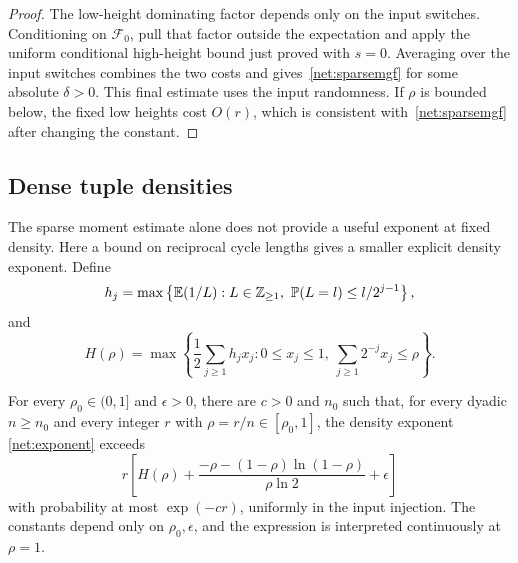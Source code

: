 \begin{proof}
The low-height dominating factor depends only on the input switches.
Conditioning on $\mathcal F_0$, pull that factor outside the
expectation and apply the uniform conditional high-height bound just
proved with $s=0$. Averaging over the input switches combines the
two costs and gives~\eqref{net:sparsemgf} for some absolute
$\delta>0$. This final estimate uses the input randomness.
If $\rho$ is bounded below, the fixed low heights cost $O(r)$,
which is consistent with~\eqref{net:sparsemgf} after changing the constant.
\end{proof}

\subsection{Dense tuple densities}\label{net:dense}
The sparse moment estimate alone does not provide a useful exponent at fixed density. Here a bound on reciprocal cycle lengths gives a smaller explicit density exponent. Define
\[
 h_j=\max\left\{\E(1/L):L\in\mathbb Z_{\ge1},\ \PP(L=l)\le l/2^{j-1}\right\},
\]
and
\[
 H(\rho)=\max\left\{\frac12\sum_{j\ge1}h_jx_j:
 0\le x_j\le1,\ \sum_{j\ge1}2^{-j}x_j\le\rho\right\}.
\]
\begin{proposition}\label{net:densetruncation}
For every $\rho_0\in(0,1]$ and $\epsilon>0$, there are
$c>0$ and $n_0$ such that, for every dyadic $n\ge n_0$ and
every integer $r$ with $\rho=r/n\in[\rho_0,1]$, the density
exponent \eqref{net:exponent} exceeds
\[
 r\left[H(\rho)+\frac{-\rho-(1-\rho)\ln(1-\rho)}{\rho\ln2}+\epsilon\right]
\]
with probability at most $\exp(-cr)$, uniformly in the input injection.
The constants depend only on $\rho_0,\epsilon$, and the expression
is interpreted continuously at $\rho=1$.
\end{proposition}
